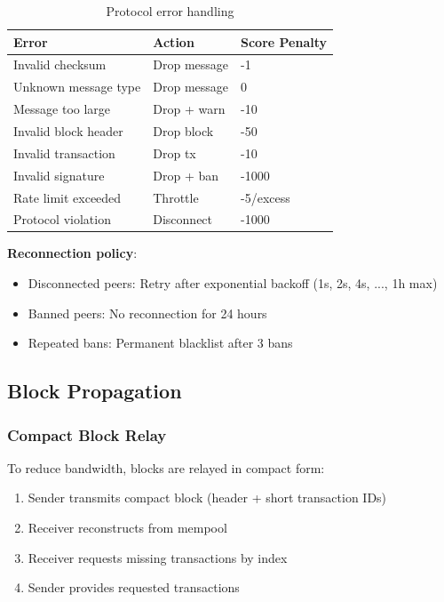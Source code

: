 \begin{table}[h]
\centering
\caption{Protocol error handling}
\label{tab:error-handling}
\begin{tabular}{@{}lll@{}}
\toprule
\textbf{Error} & \textbf{Action} & \textbf{Score Penalty} \\
\midrule
Invalid checksum & Drop message & -1 \\
Unknown message type & Drop message & 0 \\
Message too large & Drop + warn & -10 \\
Invalid block header & Drop block & -50 \\
Invalid transaction & Drop tx & -10 \\
Invalid signature & Drop + ban & -1000 \\
Rate limit exceeded & Throttle & -5/excess \\
Protocol violation & Disconnect & -1000 \\
\bottomrule
\end{tabular}
\end{table}

\textbf{Reconnection policy}:
\begin{itemize}
  \item Disconnected peers: Retry after exponential backoff (1s, 2s, 4s, ..., 1h max)
  \item Banned peers: No reconnection for 24 hours
  \item Repeated bans: Permanent blacklist after 3 bans
\end{itemize}

\subsection{Block Propagation}

\subsubsection{Compact Block Relay}

To reduce bandwidth, blocks are relayed in compact form:

\begin{enumerate}
  \item Sender transmits compact block (header + short transaction IDs)
  \item Receiver reconstructs from mempool
  \item Receiver requests missing transactions by index
  \item Sender provides requested transactions
\end{enumerate}

